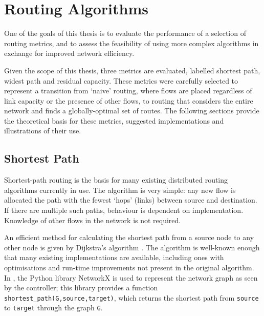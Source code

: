 \chapter{Routing Algorithms}
\label{ch:algorithm}

One of the goals of this thesis is to evaluate the performance of a selection of routing metrics, and to assess the feasibility of using more complex algorithms in exchange for improved network efficiency.

Given the scope of this thesis, three metrics are evaluated, labelled shortest path, widest path and residual capacity. These metrics were carefully selected to represent a transition from `naive' routing, where flows are placed regardless of link capacity or the presence of other flows, to routing that considers the entire network and finds a globally-optimal set of routes. The following sections provide the theoretical basis for these metrics, suggested implementations and illustrations of their use.

\section{Shortest Path}
Shortest-path routing is the basis for many existing distributed routing algorithms currently in use. The algorithm is very simple: any new flow is allocated the path with the fewest `hops' (links) between source and destination. If there are multiple such paths, behaviour is dependent on implementation. Knowledge of other flows in the network is not required.

An efficient method for calculating the shortest path from a source node to any other node is given by Dijkstra's algorithm \cite[pp. 684--693]{cormen:algorithms}. The algorithm is well-known enough that many existing implementations are available, including ones with optimisations and run-time improvements not present in the original algorithm. In \thesis{}, the Python library NetworkX \cite{networkx} is used to represent the network graph as seen by the controller; this library provides a function \texttt{shortest\_path(G,source,target)}, which returns the shortest path from \texttt{source} to \texttt{target} through the graph \texttt{G}.

